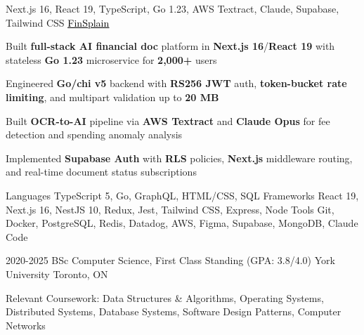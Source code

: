 \documentclass[11pt, a4paper]{awesome-cv}
\begin{document}

\begin{cventries}
  \cventry
  {Next.js 16, React 19, TypeScript, Go 1.23, AWS Textract, Claude, Supabase, Tailwind CSS}
  {\href{https://finsplain.net}{\textcolor{black}{\underline{FinSplain}} \faExternalLink}}
  {}
  {}
  {
    \begin{cvitems}
      \item {Built \textbf{full-stack AI financial doc} platform in \textbf{Next.js 16}/\textbf{React 19} with stateless \textbf{Go 1.23} microservice for \textbf{2,000+} users}
      \item {Engineered \textbf{Go/chi v5} backend with \textbf{RS256 JWT} auth, \textbf{token-bucket rate limiting}, and multipart validation up to \textbf{20 MB}}
      \item {Built \textbf{OCR-to-AI} pipeline via \textbf{AWS Textract} and \textbf{Claude Opus} for fee detection and spending anomaly analysis}
      \item {Implemented \textbf{Supabase Auth} with \textbf{RLS} policies, \textbf{Next.js} middleware routing, and real-time document status subscriptions}
    \end{cvitems}
  }
\end{cventries}


\begin{cvskills}
  \cvskill
  {Languages}
  {TypeScript 5, Go, GraphQL, HTML/CSS, SQL}
  \cvskill
  {Frameworks}
  {React 19, Next.js 16, NestJS 10, Redux, Jest, Tailwind CSS, Express, Node}
  \cvskill
  {Tools}
  {Git, Docker, PostgreSQL, Redis, Datadog, AWS, Figma, Supabase, MongoDB, Claude Code}
\end{cvskills}

\vspace{-2mm}

\begin{cventries}
  \cventry
  {2020-2025}
  {BSc Computer Science, First Class Standing (GPA: 3.8/4.0)}
  {York University}
  {Toronto, ON}
  {%
    \begin{cvitems}
      \item {Relevant Coursework: Data Structures \& Algorithms, Operating Systems, Distributed Systems, Database Systems, Software Design Patterns, Computer Networks}
    \end{cvitems}
    \vspace{-4mm}
  }
\end{cventries}
\end{document}
